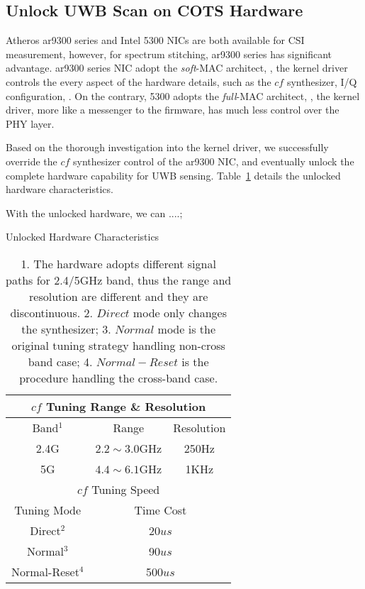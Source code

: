 
\subsection{Unlock UWB Scan on COTS Hardware} %
\label{sub:unlock_uwb_Scan_access_on_cots}

Atheros ar9300 series and Intel 5300 NICs 
are both available for CSI measurement\cite{csitool, Xie2015Precise}, 
however, for spectrum stitching, ar9300 series has significant advantage.
%
ar9300 series NIC adopt the \textit{soft}-MAC architect, 
\ie, the kernel driver controls the every aspect of the hardware details, 
such as the $cf$ synthesizer, I/Q configuration, \etc.
%
On the contrary, 5300 adopts the \textit{full}-MAC architect, 
\ie, the kernel driver, more like a messenger to the firmware, has much less control over the PHY layer.

Based on the thorough investigation into the kernel driver, 
we successfully override the $cf$ synthesizer control of the ar9300 NIC,
and eventually unlock the complete hardware capability for UWB sensing. 
Table~\ref{tab:cf_tuning_range} details the unlocked hardware characteristics. 

With the unlocked hardware, we can ....;

\begin{table}[tb]
	\caption{Unlocked Hardware Characteristics}
	\label{tab:cf_tuning_range}
	\centering

	\begin{tabular}{c|cc}
	\hline

	\hline
	\multicolumn{3}{c}{$cf$ Tuning Range \& Resolution} \\
	\hline
	Band$^1$ & Range & Resolution\\
	\hline
	2.4G & $2.2\sim 3.0$GHz & 250Hz \\
	5G   & $4.4\sim 6.1$GHz & 1KHz \\
	\hline

	\hline
	\multicolumn{3}{c}{$cf$ Tuning Speed} \\
	\hline
	Tuning Mode & \multicolumn{2}{c}{Time Cost}\\
	\hline
	Direct$^2$ & \multicolumn{2}{c}{20$us$} \\
	Normal$^3$   & \multicolumn{2}{c}{90$us$} \\
	Normal-Reset$^4$   & \multicolumn{2}{c}{500$us$} \\
	\hline
	\end{tabular}
	\caption*{1. The hardware adopts different signal paths for 2.4/5GHz band, thus the range and resolution are different and they are discontinuous. 2. $Direct$ mode only changes the synthesizer;
	3. $Normal$ mode is the original tuning strategy handling non-cross band case; 4. $Normal-Reset$ is the procedure handling the cross-band case. }
\end{table}


